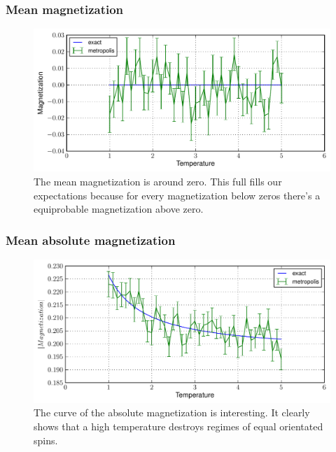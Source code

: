 \documentclass[12pt,a4paper]{scrartcl}
\begin{document}
\subsubsection{Mean magnetization}
\begin{figure}[H]
\includegraphics[width=14.0cm]{../plots/Mean_magnetization.pdf}
\caption{The mean magnetization is around zero. This full fills our expectations because for every magnetization below zeros there's a equiprobable  magnetization above zero.}
\end{figure}

\subsubsection{Mean absolute magnetization}
\begin{figure}[H]
\includegraphics[width=14.0cm]{../plots/Mean_absolute_magnetization.pdf}
\caption{The curve of the absolute magnetization is interesting. It clearly shows that a high temperature destroys regimes of equal orientated spins.} 
\end{figure}
\end{document}
